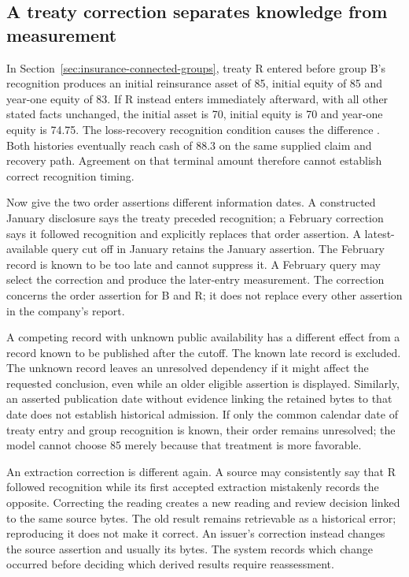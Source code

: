 \subsection*{A treaty correction separates knowledge from measurement}

In Section~\ref{sec:insurance-connected-groups}, treaty R entered before
group B's recognition produces an initial reinsurance asset of 85,
initial equity of 85 and year-one equity of 83. If R instead enters
immediately afterward, with all other stated facts unchanged, the initial
asset is 70, initial equity is 70 and year-one equity is 74.75.
The loss-recovery recognition condition causes the difference
\citep[paragraph 66A and B119C]{aasb17}. Both histories eventually
reach cash of 88.3 on the same supplied claim and recovery path.
Agreement on that terminal amount therefore cannot establish correct
recognition timing.

Now give the two order assertions different information dates. A constructed
January disclosure says the treaty preceded recognition; a February correction
says it followed recognition and explicitly replaces that order assertion.
A latest-available query cut off in January retains the January assertion.
The February record is known to be too late and cannot suppress it.
A February query may select the correction and produce the later-entry
measurement. The correction concerns the order assertion for B and R;
it does not replace every other assertion in the company's report.

A competing record with unknown public availability has a different effect
from a record known to be published after the cutoff. The known late record
is excluded. The unknown record leaves an unresolved dependency if it might
affect the requested conclusion, even while an older eligible assertion is
displayed. Similarly, an asserted publication date without evidence linking
the retained bytes to that date does not establish historical admission.
If only the common calendar date of treaty entry and group recognition is
known, their order remains unresolved; the model cannot choose 85 merely
because that treatment is more favorable.

An extraction correction is different again. A source may consistently say
that R followed recognition while its first accepted extraction mistakenly
records the opposite. Correcting the reading creates a new reading and
review decision linked to the same source bytes. The old result remains
retrievable as a historical error; reproducing it does not make it correct.
An issuer's correction instead changes the source assertion and usually
its bytes. The system records which change occurred before deciding which
derived results require reassessment.

